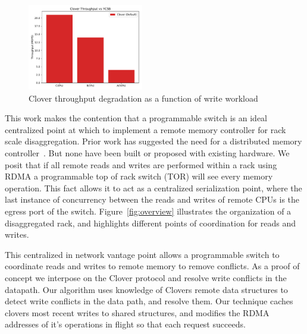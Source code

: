\begin{figure}
    \includegraphics[width=0.45\textwidth]{fig/clover_tput.pdf}
    \caption{Clover throughput degradation as a function of write
    workload}
    \label{fig:clover_tput}
\end{figure}



This work makes the contention that a programmable switch is an ideal
centralized point at which to implement a remote memory controller
for rack scale disaggregation. Prior work has suggested the need for
a distributed memory controller~\cite{disandapp}. But none have been
built or proposed with existing hardware. We posit that if all remote
reads and writes are performed within a rack using RDMA a programmable
top of rack switch (TOR) will see every memory operation. This fact
allows it to act as a centralized serialization point, where the last
instance of concurrency between the reads and writes of remote CPUs is
the egress port of the switch. Figure~\ref{fig:overview} illustrates
the organization of a disaggregated rack, and highlights different
points of coordination for reads and writes.

This centralized in network vantage point allows a programmable switch
to coordinate reads and writes to remote memory to remove conflicts.
As a proof of concept we interpose on the Clover protocol and resolve
write conflicts in the datapath. Our algorithm uses knowledge of
Clovers remote data structures to detect write conflicts in the data
path, and resolve them. Our technique caches clovers most recent
writes to shared structures, and modifies the RDMA addresses of it's
operations in flight so that each request succeeds. 

